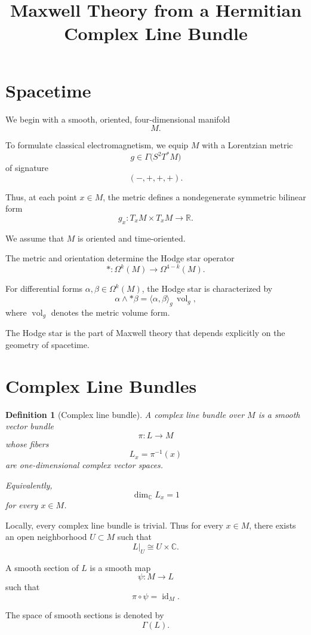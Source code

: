 \documentclass[11pt,a4paper]{article}
\title{\textbf{Maxwell Theory from a Hermitian Complex Line Bundle}}
\author{}
\date{}
\newtheorem{definition}{Definition}[section]
\newcommand{\R}{\mathbb{R}}
\newcommand{\C}{\mathbb{C}}
\newcommand{\id}{\operatorname{id}}
\newcommand{\vol}{\operatorname{vol}}
\begin{document}
\maketitle
\tableofcontents

\section{Spacetime}

We begin with a smooth, oriented, four-dimensional manifold
\[
M.
\]

To formulate classical electromagnetism, we equip $M$ with a
Lorentzian metric
\[
g \in \Gamma\bigl(S^2T^*M\bigr)
\]
of signature
\[
(-,+,+,+).
\]

Thus, at each point $x\in M$, the metric defines a nondegenerate
symmetric bilinear form
\[
g_x:T_xM\times T_xM\longrightarrow \R.
\]

We assume that $M$ is oriented and time-oriented.

The metric and orientation determine the Hodge star operator
\[
*:\Omega^k(M)\longrightarrow\Omega^{4-k}(M).
\]

For differential forms $\alpha,\beta\in\Omega^k(M)$, the Hodge star
is characterized by
\[
\alpha\wedge *\beta
=
\langle \alpha,\beta\rangle_g\,\vol_g,
\]
where $\vol_g$ denotes the metric volume form.

The Hodge star is the part of Maxwell theory that depends explicitly
on the geometry of spacetime.

\section{Complex Line Bundles}

\begin{definition}[Complex line bundle]
A \emph{complex line bundle} over $M$ is a smooth vector bundle
\[
\pi:L\longrightarrow M
\]
whose fibers
\[
L_x=\pi^{-1}(x)
\]
are one-dimensional complex vector spaces.

Equivalently,
\[
\dim_{\C}L_x=1
\]
for every $x\in M$.
\end{definition}

Locally, every complex line bundle is trivial. Thus for every
$x\in M$, there exists an open neighborhood $U\subset M$ such that
\[
L|_U\cong U\times\C.
\]

A smooth section of $L$ is a smooth map
\[
\psi:M\longrightarrow L
\]
such that
\[
\pi\circ\psi=\id_M.
\]

The space of smooth sections is denoted by
\[
\Gamma(L).
\]
\end{document}

